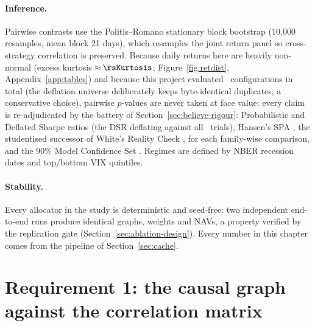 \paragraph{Inference.} Pairwise contrasts use the Politis--Romano stationary
block bootstrap \cite{politis1994stationary} (10{,}000 resamples, mean
block 21
days), which resamples the joint return panel so cross-strategy correlation
is preserved. Because daily returns here are heavily non-normal (excess
kurtosis ${\approx}\,\rsKurtosis$; Figure~\ref{fig:retdist},
Appendix~\ref{app:tables}) and because this
project evaluated \rsNtrials\ configurations in total (the deflation
universe deliberately keeps byte-identical duplicates, a conservative
choice), pairwise
$p$-values are never taken at face value: every claim is re-adjudicated by
the battery of Section~\ref{sec:believe-rigour}: Probabilistic and
Deflated Sharpe ratios \cite{bailey2012psr,bailey2014deflated} (the DSR
deflating against all \rsNtrials\ trials), Hansen's SPA
\cite{hansen2005spa}, the studentised successor of White's Reality
Check \cite{white2000reality}, for each
family-wise comparison, and the $90\%$ Model Confidence Set
\cite{hansen2011mcs}. Regimes are defined by NBER recession dates and
top/bottom VIX quintiles.

\paragraph{Stability.} Every allocator in the study is deterministic and
seed-free: two independent end-to-end runs produce identical graphs,
weights and NAVs, a property verified by the replication gate
(Section~\ref{sec:ablation-design}). Every number in this chapter comes
from the pipeline of Section~\ref{sec:cache}.

\section{Requirement 1: the causal graph against the correlation matrix}
\label{sec:r1}

